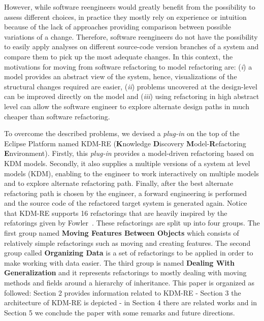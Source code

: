 However, while software reengineers would greatly benefit from the possibility to assess different choices, in practice they mostly rely on experience or intuition because of the lack of approaches providing comparison between possible variations of a change. 
Therefore, software reengineers do not have the possibility to easily apply analyses on different source-code version branches of a system and compare them to pick up the most adequate changes. In this context, the motivations for moving from software refactoring  to model refactoring are: 
(\textit{i}) a model provides an abstract view of the system, hence, visualizations of the structural changes required are easier, 
(\textit{ii}) problems uncovered at the design-level can be improved directly on the model and 
(\textit{iii}) using refactoring in high abstract level can allow the software engineer to explore alternate design paths in much cheaper than software refactoring.

To overcome the described problems, we devised a \textit{plug-in} on the top of the Eclipse Platform named KDM-RE (\textbf{K}nowledge \textbf{D}iscovery \textbf{M}odel-\textbf{R}efactoring \textbf{E}nvironment). Firstly, this \textit{plug-in} provides a model-driven refactoring based on KDM models. Secondly, it also supplies a multiple versions of a system at level models (KDM), enabling to the engineer  to work interactively on multiple models and to explore alternate refactoring path. Finally, after the best alternate refactoring path is chosen by the engineer, a forward engineering is performed and the source code of the refactored target system is generated again. Notice that KDM-RE supports 16 refactorings that are heavily inspired by the refatorings given by Fowler~\cite{aqui}. These refactorings are split up into four groups. The first group named \textbf{Moving Features Between Objects} which consists of relatively simple refactorings such as moving and creating features. The second group called \textbf{Organizing Data} is a set of refactorings to be applied in order to make working with data easier. The third group is named \textbf{Dealing With Generalization} and it represents refactorings to mostly dealing with moving methods and fields around a hierarchy of inheritance. This paper is organized as followed: Section 2 provides information related to KDM-RE - Section 3 the architecture of KDM-RE is depicted - in Section 4 there are related works and in Section 5 we conclude the paper with some remarks and future directions.





